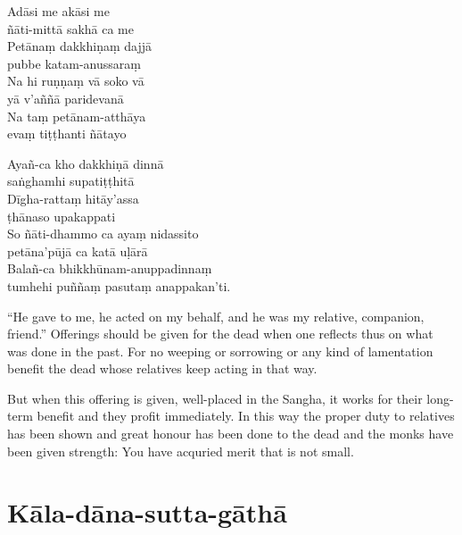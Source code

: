 

\begin{paritta}
Adāsi me akāsi me\\\vin ñāti-mittā sakhā ca me\\
Petānaṃ dakkhiṇaṃ dajjā\\\vin pubbe katam-anussaraṃ\\
Na hi ruṇṇaṃ vā soko vā\\\vin yā v'aññā paridevanā\\
Na taṃ petānam-atthāya\\\vin evaṃ tiṭṭhanti ñātayo


Ayañ-ca kho dakkhiṇā dinnā\\\vin saṅghamhi supatiṭṭhitā\\
Dīgha-rattaṃ hitāy'assa\\\vin ṭhānaso upakappati\\
So ñāti-dhammo ca ayaṃ nidassito\\\vin petāna'pūjā ca katā uḷārā\\
Balañ-ca bhikkhūnam-anuppadinnaṃ\\\vin tumhehi puññaṃ pasutaṃ anappakan'ti.
\end{paritta}


\begin{english}
  ``He gave to me, he acted on my behalf, and he was my relative, companion,
  friend.'' Offerings should be given for the dead when one reflects thus on
  what was done in the past. For no weeping or sorrowing or any kind of
  lamentation benefit the dead whose relatives keep acting in that way.

  \bigskip

  But when this offering is given, well-placed in the Sangha, it works for their
  long-term benefit and they profit immediately. In this way the proper duty to
  relatives has been shown and great honour has been done to the dead and the
  monks have been given strength: You have acquried merit that is not small.
\end{english}


\section{Kāla-dāna-sutta-gāthā}

